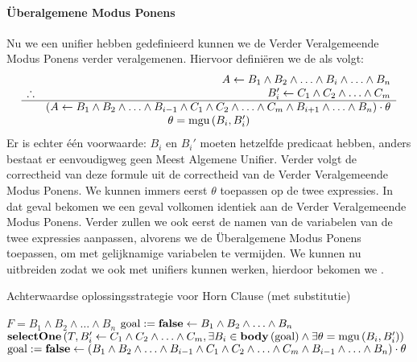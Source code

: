 \paragraph{\"Uberalgemene Modus Ponens}
Nu we een unifier hebben gedefinieerd kunnen we de Verder Veralgemeende Modus Ponens verder veralgemenen. Hiervoor defini\"eren we de  als volgt:
\begin{equation}
\begin{array}{lr}
&A\leftarrow B_1\wedge B_2\wedge\ldots\wedge B_i\wedge\ldots\wedge B_n\\
\therefore&B_i'\leftarrow C_1\wedge C_2\wedge\ldots\wedge C_m\\
\hline
&\left(A\leftarrow B_1\wedge B_2\wedge\ldots\wedge B_{i-1}\wedge C_1\wedge C_2\wedge\ldots\wedge C_m\wedge B_{i+1}\wedge\ldots\wedge B_n\right)\cdot\theta\\
\multicolumn{2}{c}{\theta=\mathfunc{mgu}{B_i,B_i'}}
\end{array}
\end{equation}
Er is echter \'e\'en voorwaarde: $B_i$ en $B_i'$ moeten hetzelfde predicaat hebben, anders bestaat er eenvoudigweg geen Meest Algemene Unifier. Verder volgt de correctheid van deze formule uit de correctheid van de Verder Veralgemeende Modus Ponens. We kunnen immers eerst $\theta$ toepassen op de twee expressies. In dat geval bekomen we een geval volkomen identiek aan de Verder Veralgemeende Modus Ponens. Verder zullen we ook eerst de namen van de variabelen van de twee expressies aanpassen, alvorens we de \"Uberalgemene Modus Ponens toepassen, om  met gelijknamige variabelen te vermijden. We kunnen nu  uitbreiden zodat we ook met unifiers kunnen werken, hierdoor bekomen we .
\begin{algorithm}[htb]                      %
\caption{Achterwaardse oplossingsstrategie voor Horn Clause (met substitutie)}          %
\label{alg:backwardUberalgemeneModusPonens}                           %
\begin{algorithmic}[1]                    %
\REQUIRE $F=B_1\wedge B_2\wedge\ldots\wedge B_n$
\STATE $\mbox{goal}:=\mbox{\bf false}\leftarrow B_1\wedge B_2\wedge\ldots\wedge B_n$
\REPEAT
\STATE$\mbox{\bf selectOne}\left( T,B_i'\leftarrow C_1\wedge C_2\wedge\ldots\wedge C_m,\exists B_i\in\mbox{\bf body}\left( \mbox{goal} \right)\wedge\exists\theta=\mbox{mgu}\left( B_i,B_i' \right) \right)$
\STATE$\mbox{goal}:=\mbox{\bf false}\leftarrow\left(B_1\wedge B_2\wedge\ldots\wedge B_{i-1}\wedge C_1\wedge C_2\wedge\ldots\wedge C_m\wedge B_{i-1}\wedge\ldots\wedge B_n\right)\cdot\theta$
\end{algorithmic}
\end{algorithm}
